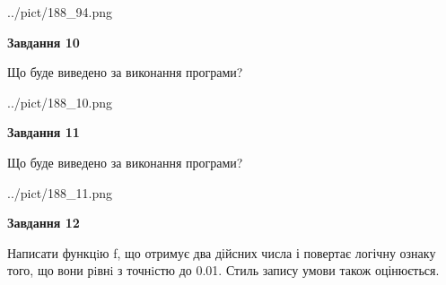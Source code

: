 \documentclass[12pt, ukrainian]{article}
\begin{document}
{\begin {large}
\begin{center}
	{../pict/188_94.png}
\end{center}
\newpage

{\begin {center}\textbf{Завдання 10}\end {center}}

Що буде виведено за виконання програми?\par
\begin{center}
	{../pict/188_10.png}
\end{center}
\newpage

{\begin {center}\textbf{Завдання 11}\end {center}}

Що буде виведено за виконання програми?\par
\begin{center}
	{../pict/188_11.png}
\end{center}
\newpage

{\begin {center}\textbf{Завдання 12}\end {center}}


Написати функцiю f, що отримує два дійсних числа і повертає логічну ознаку того, що вони рiвнi з точнiстю до 0.01. Стиль запису умови також оцінюється.\par
\newpage

\end {large}}
\end{document}
